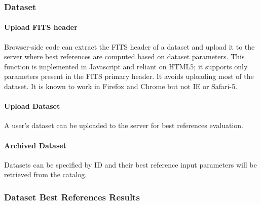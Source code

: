 \documentclass[letterpaper,10pt,english]{sphinxmanual}
\begin{document}
\subsubsection{Dataset}
\label{web_site_use:dataset}

\paragraph{Upload FITS header}
\label{web_site_use:upload-fits-header}
Browser-side code can extract the FITS header of a dataset and upload it to the
server where best references are computed based on dataset parameters.   This
function is implemented in Javascript and reliant on HTML5;  it supports only
parameters present in the FITS primary header.   It avoids uploading most of the
dataset.   It is known to work in Firefox and Chrome but not IE or Safari-5.


\paragraph{Upload Dataset}
\label{web_site_use:upload-dataset}
A user's dataset can be uploaded to the server for best references evaluation.


\paragraph{Archived Dataset}
\label{web_site_use:archived-dataset}
Datasets can be specified by ID and their best reference input parameters will
be retrieved from the catalog.


\subsubsection{Dataset Best References Results}
\label{web_site_use:dataset-best-references-results}\begin{figure}[htbp]
\centering

\end{figure}
\end{document}
